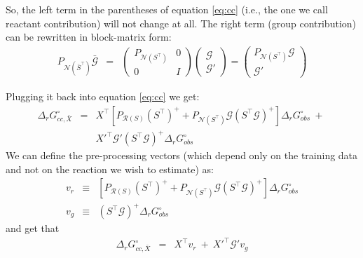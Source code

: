 \documentclass[11pt]{article}
\newcommand{\Gmat}{\mathcal{G}}
\newcommand{\PRmat}[1]{P_{\mathcal{R}\left(#1\right)}}
\newcommand{\PNmat}[1]{P_{\mathcal{N}\left(#1\right)}}
\begin{document}
So, the left term in the parentheses of equation \ref{eq:cc} (i.e., the one we call reactant contribution) will not change at all. The right term (group contribution) can be rewritten in block-matrix form:
\begin{eqnarray}\label{eq:P_N_ST_G}
\PNmat{\bar{S}^\top} \bar{\Gmat} &=& 
\left( \begin{array}{c|c} \PNmat{S^\top} & 0 \\ \hline 0 & I \end{array} \right)
\left( \begin{array}{c} \Gmat \\ \hline \Gmat'\end{array} \right)
 = \left( \begin{array}{c} \PNmat{S^\top} \Gmat \\ \hline \Gmat' \end{array} \right)
\end{eqnarray}

Plugging it back into equation \ref{eq:cc} we get:
\begin{eqnarray}
\Delta_{r}G_{cc,\bar{X}}^{\circ} &=& 
    X^\top \left[
	\PRmat{S} \left(S^{\top}\right)^{+} +
	\PNmat{S^\top} \Gmat  \left(S^{\top}\Gmat\right)^{+} \right]\Delta_{r}G_{obs}^{\circ} ~+~ \nonumber\\ && 
	X'^\top \Gmat' \left(S^{\top}\Gmat\right)^{+} \Delta_{r}G_{obs}^{\circ}
\end{eqnarray}
We can define the pre-processing vectors (which depend only on the training data and not on the reaction we wish to estimate) as:
\begin{eqnarray}
	v_{r} &\equiv&
	\left[
		\PRmat{S} \left(S^{\top}\right)^{+} + 
		\PNmat{S^\top} \Gmat \left(S^{\top}\Gmat\right)^{+}
	\right]
	\Delta_{r}G_{obs}^{\circ}
\\
	v_g &\equiv& \left(S^{\top}\Gmat\right)^{+} \Delta_{r}G_{obs}^{\circ}
\end{eqnarray}
and get that
\begin{eqnarray}
\Delta_{r}G_{cc,\bar{X}}^{\circ} &=& X^\top v_r ~+~ X'^\top \Gmat' v_g
\end{eqnarray}
\end{document}

